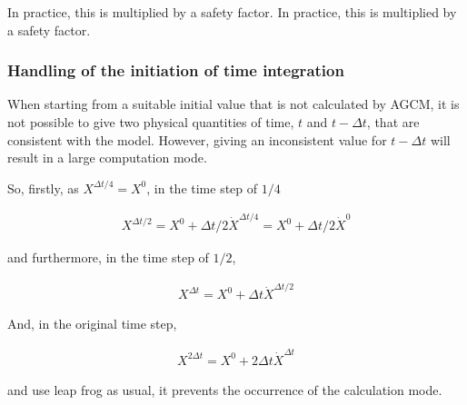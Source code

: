 In practice, this is multiplied by a safety factor. In practice, this is
multiplied by a safety factor.

\hypertarget{handling-of-the-initiation-of-time-integration}{%
\subsubsection{Handling of the initiation of time
integration}\label{handling-of-the-initiation-of-time-integration}}

When starting from a suitable initial value that is not calculated by
AGCM, it is not possible to give two physical quantities of time, \(t\)
and \(t-\Delta t\), that are consistent with the model. However, giving
an inconsistent value for \(t-\Delta t\) will result in a large
computation mode.

So, firstly, as \(X^{\Delta t/4} = X^0\), in the time step of \(1/4\)

\begin{eqnarray}
  X^{\Delta t/2} = X^0 + \Delta t/2 \dot{X}^{\Delta t/4}
                 = X^0 + \Delta t/2 \dot{X}^0
\end{eqnarray}

and furthermore, in the time step of \(1/2\),

\begin{eqnarray}
  X^{\Delta t}   = X^0 + \Delta t \dot{X}^{\Delta t/2}
\end{eqnarray}

And, in the original time step,

\begin{eqnarray}
  X^{2\Delta t}   = X^0 + 2 \Delta t \dot{X}^{\Delta t}
\end{eqnarray}

and use leap frog as usual, it prevents the occurrence of the
calculation mode.
